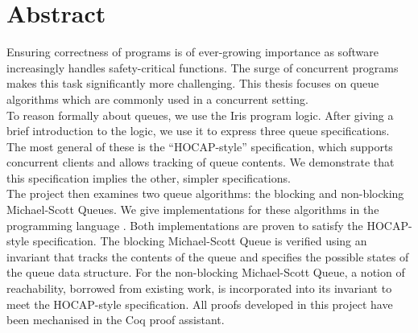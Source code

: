 \documentclass[a4paper, 10pt]{report}
\theoremstyle{definition}
\begin{document}

\pagestyle{empty}
\vspace*{\fill}
\clearpage


\pagestyle{plain}


\chapter*{Abstract}

Ensuring correctness of programs is of ever-growing importance as software increasingly handles safety-critical functions. The surge of concurrent programs makes this task significantly more challenging. This thesis focuses on queue algorithms which are commonly used in a concurrent setting.\\
To reason formally about queues, we use the Iris program logic. After giving a brief introduction to the logic, we use it to express three queue specifications. The most general of these is the ``HOCAP-style'' specification, which supports concurrent clients and allows tracking of queue contents. We demonstrate that this specification implies the other, simpler specifications.\\
The project then examines two queue algorithms: the blocking and non-blocking Michael-Scott Queues. We give implementations for these algorithms in the programming language \heaplang{}. Both implementations are proven to satisfy the HOCAP-style specification. The blocking Michael-Scott Queue is verified using an invariant that tracks the contents of the queue and specifies the possible states of the queue data structure. For the non-blocking Michael-Scott Queue, a notion of reachability, borrowed from existing work, is incorporated into its invariant to meet the HOCAP-style specification. All proofs developed in this project have been mechanised in the Coq proof assistant.
\end{document}
